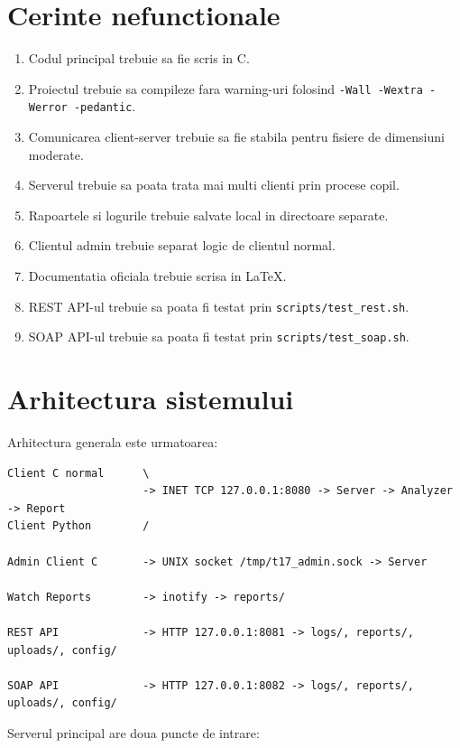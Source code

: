 \documentclass[12pt,a4paper]{article}
\begin{document}
\section{Cerinte nefunctionale}

\begin{enumerate}[label=CNF\arabic*.]
    \item Codul principal trebuie sa fie scris in C.
    \item Proiectul trebuie sa compileze fara warning-uri folosind \texttt{-Wall -Wextra -Werror -pedantic}.
    \item Comunicarea client-server trebuie sa fie stabila pentru fisiere de dimensiuni moderate.
    \item Serverul trebuie sa poata trata mai multi clienti prin procese copil.
    \item Rapoartele si logurile trebuie salvate local in directoare separate.
    \item Clientul admin trebuie separat logic de clientul normal.
    \item Documentatia oficiala trebuie scrisa in LaTeX.
    \item REST API-ul trebuie sa poata fi testat prin \texttt{scripts/test\_rest.sh}.
    \item SOAP API-ul trebuie sa poata fi testat prin \texttt{scripts/test\_soap.sh}.
\end{enumerate}

\section{Arhitectura sistemului}

Arhitectura generala este urmatoarea:

\begin{lstlisting}[style=code]
Client C normal      \
                     -> INET TCP 127.0.0.1:8080 -> Server -> Analyzer -> Report
Client Python        /

Admin Client C       -> UNIX socket /tmp/t17_admin.sock -> Server

Watch Reports        -> inotify -> reports/

REST API             -> HTTP 127.0.0.1:8081 -> logs/, reports/, uploads/, config/

SOAP API             -> HTTP 127.0.0.1:8082 -> logs/, reports/, uploads/, config/
\end{lstlisting}

Serverul principal are doua puncte de intrare:
\end{document}
